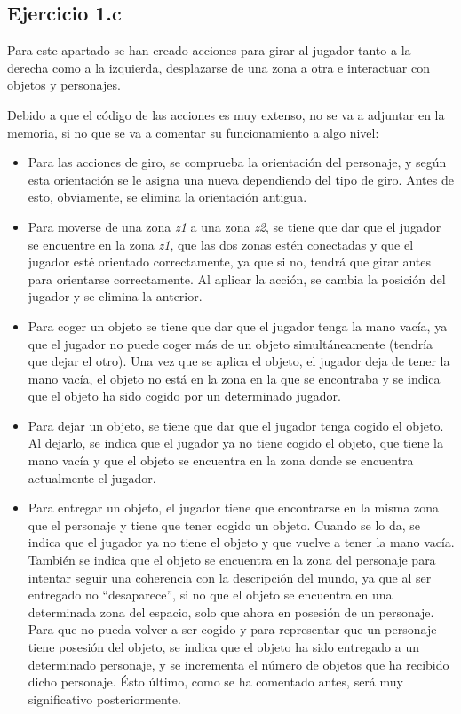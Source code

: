 \documentclass[11pt,a4paper]{article}
\begin{document}
\subsection{Ejercicio 1.c}

Para este apartado se han creado acciones para girar al jugador tanto a la derecha como a la izquierda, desplazarse de una
zona a otra e interactuar con objetos y personajes.

Debido a que el código de las acciones es muy extenso, no se va a adjuntar en la memoria, si no que se va a comentar su funcionamiento
a algo nivel:

\begin{itemize}
	\item Para las acciones de giro, se comprueba la orientación del personaje, y según esta orientación se le asigna una nueva
	dependiendo del tipo de giro. Antes de esto, obviamente, se elimina la orientación antigua.
	\item Para moverse de una zona \textit{z1} a una zona \textit{z2}, se tiene que dar que el jugador se encuentre en la zona
	\textit{z1}, que las dos zonas estén conectadas y que el jugador esté orientado correctamente, ya que si no, tendrá que girar
	antes para orientarse correctamente. Al aplicar la acción, se cambia la posición del jugador y se elimina la anterior.
	\item Para coger un objeto se tiene que dar que el jugador tenga la mano vacía, ya que el jugador no puede coger más de un
	objeto simultáneamente (tendría que dejar el otro). Una vez que se aplica el objeto, el jugador deja de tener la mano vacía,
	el objeto no está en la zona en la que se encontraba y se indica que el objeto ha sido cogido por un determinado jugador.
	\item Para dejar un objeto, se tiene que dar que el jugador tenga cogido el objeto. Al dejarlo, se indica que el jugador ya no
	tiene cogido el objeto, que tiene la mano vacía y que el objeto se encuentra en la zona donde se encuentra actualmente el jugador.
	\item Para entregar un objeto, el jugador tiene que encontrarse en la misma zona que el personaje y tiene que tener cogido un
	objeto. Cuando se lo da, se indica que el jugador ya no tiene el objeto y que vuelve a tener la mano vacía. También se indica
	que el objeto se encuentra en la zona del personaje para intentar seguir una coherencia con la descripción del mundo, ya que
	al ser entregado no ``desaparece'', si no que el objeto se encuentra en una determinada zona del espacio, solo que ahora en
	posesión de un personaje. Para que no pueda volver a ser cogido y para representar que un personaje tiene posesión del objeto, se
	indica que el objeto ha sido entregado a un determinado personaje, y se incrementa el número de objetos que ha recibido dicho
	personaje. Ésto último, como se ha comentado antes, será muy significativo posteriormente.
\end{itemize}
\end{document}
